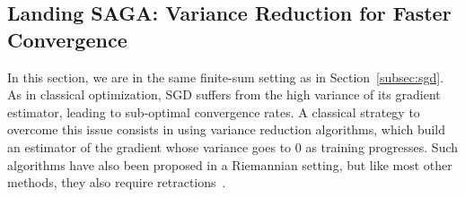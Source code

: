 \documentclass[twoside,11pt]{article}
\begin{document}
%

\subsection{Landing SAGA: Variance Reduction for Faster Convergence}
\label{subsec:SAGA}

In this section, we are in the same finite-sum setting as in Section~\ref{subsec:sgd}.
As in classical optimization, SGD suffers from the high variance of its gradient estimator, leading to sub-optimal convergence rates.
A classical strategy to overcome this issue consists in using variance reduction algorithms, which build an estimator of the gradient whose variance goes to $0$ as training progresses.
Such algorithms have also been proposed in a Riemannian setting, but like most other methods, they also require retractions~\citep{zhang2016riemannian}.
\end{document}
